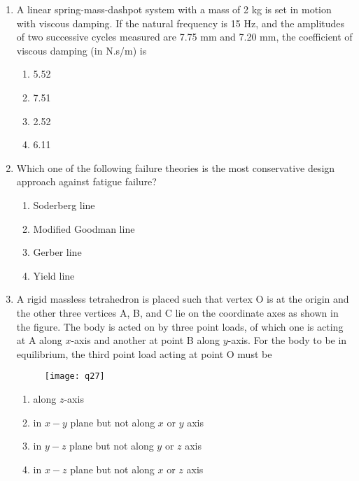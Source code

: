 \documentclass[journal,11pt,onecolumn]{IEEEtran}
\begin{document}
\begin{enumerate}[resume]
    \item A linear spring-mass-dashpot system with a mass of 2 kg is set in motion with viscous damping. If the natural frequency is 15 Hz, and the amplitudes of two successive cycles measured are 7.75 mm and 7.20 mm, the coefficient of viscous damping (in N.s/m) is

          \begin{enumerate}
              \item 5.52
              \item 7.51
              \item 2.52
              \item 6.11
          \end{enumerate}

    \item Which one of the following failure theories is the most conservative design approach against fatigue failure?

          \begin{enumerate}
              \item Soderberg line
              \item Modified Goodman line
              \item Gerber line
              \item Yield line
          \end{enumerate}

    \item A rigid massless tetrahedron is placed such that vertex O is at the origin and the other three vertices A, B, and C lie on the coordinate axes as shown in the figure. The body is acted on by three point loads, of which one is acting at A along $x$-axis and another at point B along $y$-axis. For the body to be in equilibrium, the third point load acting at point O must be

          \begin{figure}[H]
              \centering
              \texttt{[image: q27]}
              \caption{}
              \label{fig:q27}
          \end{figure}

          \begin{enumerate}
              \item along $z$-axis
              \item in $x-y$ plane but not along $x$ or $y$ axis
              \item in $y-z$ plane but not along $y$ or $z$ axis
              \item in $x-z$ plane but not along $x$ or $z$ axis
          \end{enumerate}


\end{enumerate}
\end{document}

